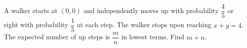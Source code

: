A walker starts at $(0,0)$ and independently moves up with probability $\dfrac{4}{5}$ or right with probability $\dfrac{1}{5}$ at each step. The walker stops upon reaching $x+y=4$. The expected number of up steps is $\dfrac{m}{n}$ in lowest terms. Find $m+n$.

